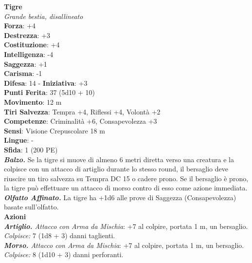 \begin{multicols}{2}
\medskip\textbf{Tigre}\\
\emph{Grande bestia, disallineato}\\
\textbf{Forza}: +4\\
\textbf{Destrezza}: +3\\
\textbf{Costituzione}: +4\\
\textbf{Intelligenza}: -4\\
\textbf{Saggezza}: +1\\
\textbf{Carisma}: -1\\
\textbf{Difesa}: 14 - \textbf{Iniziativa}: +3\\
\textbf{Punti Ferita}: 37 (5d10 + 10)\\
\textbf{Movimento}: 12 m\\
\textbf{Tiri Salvezza}: Tempra +4, Riflessi +4, Volontà +2\\
\textbf{Competenze}: Criminalità +6, Consapevolezza +3\\
\textbf{Sensi}: Visione Crepuscolare 18 m\\
\textbf{Lingue}: -\\
\textbf{Sfida}: 1 (200 PE)\smallskip\\
\emph{\textbf{Balzo.}} Se la tigre si muove di almeno 6 metri diretta verso una creatura e la colpisce con un attacco di artiglio durante lo stesso round, il bersaglio deve riuscire un tiro salvezza su Tempra DC  15 o cadere prono. Se il bersaglio è prono, la tigre può effettuare un attacco di morso contro di esso come azione immediata.
\emph{\textbf{Olfatto Affinato.}} La tigre ha +1d6 alle prove di Saggezza (Consapevolezza) basate sull'olfatto.\\
\smallskip\textbf{Azioni}\\
\emph{\textbf{Artiglio.} Attacco con Arma da Mischia}: +7 al colpire, portata 1 m, un bersaglio.\\
\emph{Colpisce:} 7 (1d8 + 3) danni taglienti.\\
\emph{\textbf{Morso.} Attacco con Arma da Mischia}: +7 al colpire, portata 1 m, un bersaglio.\\
\emph{Colpisce:} 8 (1d10 + 3) danni perforanti.\\


\end{multicols}
